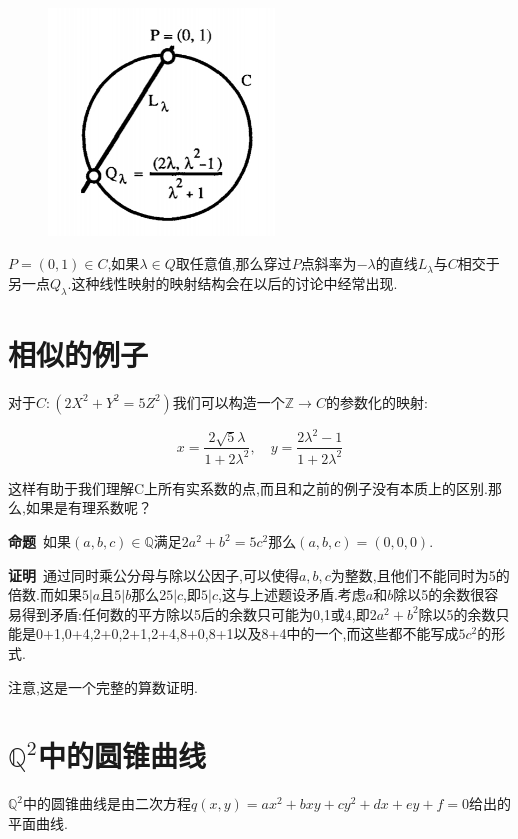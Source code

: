 \documentclass[UTF8]{book}
\begin{document}
	

		\begin{figure}[H]
		  \centering
		  \includegraphics[width=6cm]{10.jpg}\\
		\end{figure}\par


		$ P=(0,1)\in C $,如果$\lambda \in Q$取任意值,那么穿过$ P $点斜率为$-\lambda$的直线$L_{\lambda}$与$ C $相交于另一点$Q_{\lambda}$.这种线性映射的映射结构会在以后的讨论中经常出现.
	
	\section{相似的例子}
		对于$ C:(2 X^{2} + Y^{2} =5 Z^{2}) $我们可以构造一个$ \mathbb{Z} \to C $的参数化的映射:
		
		\begin{equation*}
		x=\frac{2 \sqrt{5} \lambda}{1+2 \lambda^{2}}, \quad y=\frac{2 \lambda^{2}-1}{1+2 \lambda^{2}}
		\end{equation*}
		
		
		
		这样有助于我们理解C上所有实系数的点,而且和之前的例子没有本质上的区别.那么,如果是有理系数呢？
	
	
		\textbf{命题}\ 如果$ (a,b,c) \in \mathbb{Q} $满足$ 2a^{2}+b^{2}=5c^{2} $那么$ (a,b,c)=(0,0,0) $.
	
	
		\textbf{证明}\ 通过同时乘公分母与除以公因子,可以使得$ a,b,c $为整数,且他们不能同时为5的倍数.而如果$5\lvert a$且$ 5\lvert b $那么$ 25 \lvert c $,即$ 5 \lvert c $,这与上述题设矛盾.考虑$ a $和$ b $除以5的余数很容易得到矛盾:任何数的平方除以5后的余数只可能为0,1或4,即$2 a^{2}+b^{2}$除以5的余数只能是0+1,0+4,2+0,2+1,2+4,8+0,8+1以及8+4中的一个,而这些都不能写成$5 c^{2}$的形式.
	
	
		注意,这是一个完整的算数证明.
	\section{$\mathbb{Q}^{2}$中的圆锥曲线}
		$\mathbb{Q}^{2}$中的圆锥曲线是由二次方程$q(x,y)=ax^{2}+bxy+cy^{2}+dx+ey+f=0$给出的平面曲线.
	
\end{document}
